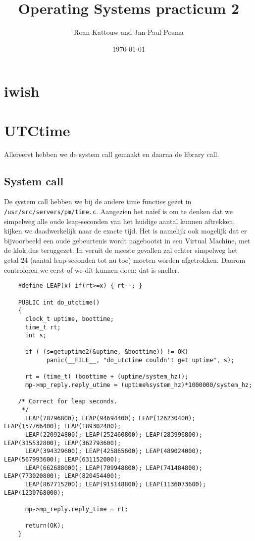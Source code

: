 \documentclass[11pt]{article}
\begin{document}
\author{Roan Kattouw and Jan Paul Posma}
\date{\today}
\title{Operating Systems practicum 2}

\maketitle

\section*{iwish}

\section*{UTCtime}
Allereerst hebben we de system call gemaakt en daarna de library call.


\subsection*{System call}
De system call hebben we bij de andere time functies gezet in \verb+/usr/src/servers/pm/time.c+.
Aangezien het na\"ief is om te denken dat we simpelweg alle oude leap-seconden van het huidige
aantal kunnen aftrekken, kijken we daadwerkelijk naar de exacte tijd. Het is namelijk ook mogelijk
dat er bijvoorbeeld een oude gebeurtenis wordt nagebootst in een Virtual Machine, met de klok
dus teruggezet. In veruit de meeste gevallen zal echter simpelweg het getal 24 (aantal leap-seconden tot
nu toe) moeten worden afgetrokken. Daarom controleren we eerst of we dit kunnen doen; dat is sneller.

\begin{verbatim}
	#define LEAP(x) if(rt>=x) { rt--; }

	PUBLIC int do_utctime()
	{
	  clock_t uptime, boottime;
	  time_t rt;
	  int s;
	
	  if ( (s=getuptime2(&uptime, &boottime)) != OK)
			panic(__FILE__, "do_utctime couldn't get uptime", s);
	
	  rt = (time_t) (boottime + (uptime/system_hz));
	  mp->mp_reply.reply_utime = (uptime%system_hz)*1000000/system_hz;
	  
	/* Correct for leap seconds.
	 */
	  LEAP(78796800); LEAP(94694400); LEAP(126230400); LEAP(157766400); LEAP(189302400);
	  LEAP(220924800); LEAP(252460800); LEAP(283996800); LEAP(315532800); LEAP(362793600); 
	  LEAP(394329600); LEAP(425865600); LEAP(489024000); LEAP(567993600); LEAP(631152000); 
	  LEAP(662688000); LEAP(709948800); LEAP(741484800); LEAP(773020800); LEAP(820454400); 
	  LEAP(867715200); LEAP(915148800); LEAP(1136073600); LEAP(1230768000);
	  
	  mp->mp_reply.reply_time = rt;
	  
	  return(OK);
	}
\end{verbatim}
\end{document}
